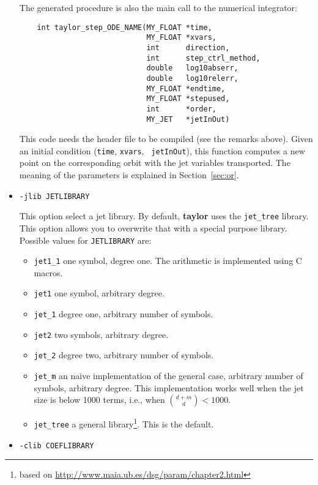 \documentclass[10pt]{article}
\theoremstyle{remark}
\newcommand{\taylorname}{{\bf taylor}}
\begin{document}
\begin{itemize}
{{The generated procedure is also the main call to the numerical
integrator:
\begin{verbatim}
    int taylor_step_ODE_NAME(MY_FLOAT *time,
                             MY_FLOAT *xvars,
                             int      direction,
                             int      step_ctrl_method,
                             double   log10abserr,
                             double   log10relerr,
                             MY_FLOAT *endtime,
                             MY_FLOAT *stepused,
                             int      *order,
                             MY_JET   *jetInOut)
\end{verbatim}
This code needs the header file to be compiled (see the remarks
above). Given an initial condition ({\tt time}, {\tt xvars}, {\tt
  jetInOut}), this function computes a new point on the corresponding
orbit with the jet variables transported. The meaning of the
parameters is explained in Section~\ref{sec:or}.  }

}
\item {
{\verb+-jlib JETLIBRARY+ 

This option select a jet library. By default, \taylorname{} uses the
\verb+jet_tree+ library. This option allows you to overwrite that with
a special purpose library. Possible values for \verb+JETLIBRARY+ are:
\begin{itemize}
    \item \verb+jet1_1+ one symbol, degree one. The arithmetic is
      implemented using C macros.
    \item \verb+jet1+  one symbol, arbitrary degree. 
    \item \verb+jet_1+ degree one, arbitrary number of symbols.
    \item \verb+jet2+ two symbols, arbitrary degree.
    \item \verb+jet_2+ degree two, arbitrary number of symbols.
    \item \verb+jet_m+ an naive implementation of the general case,
      arbitrary number of symbols, arbitrary degree. This
      implementation works well when the jet size is below 1000 terms,
      i.e., when ${{d+m} \choose {d}} < 1000$.
    \item \verb+jet_tree+ a general library\footnote{based on
    \url{http://www.maia.ub.es/dsg/param/chapter2.html}}. This is the
      default.
\end{itemize}
}
}
\item {
{\verb+-clib COEFLIBRARY+ 

}}
\end{itemize}
\end{document}
